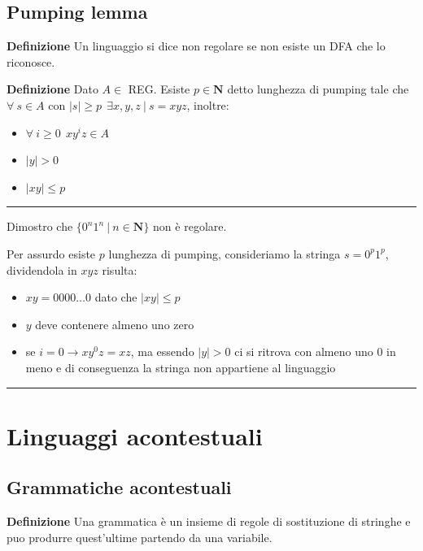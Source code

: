 \documentclass{article}
\begin{document}
\subsection{Pumping lemma}

\textbf{Definizione} Un linguaggio si dice non regolare se non esiste un DFA che lo riconosce.\newline

\noindent\textbf{Definizione} Dato $A\in$ REG. Esiste $p\in\mathbf{N}$ detto lunghezza di pumping tale che $\forall\ s \in A \text{ con } |s|\geq p\ \ \exists x,y,z\ |\ s=xyz$, inoltre:
\begin{itemize}
    \item $\forall\ i\geq0\ \ xy^iz\in A$
    \item $|y|>0$
    \item $|xy|\leq p$
\end{itemize}

\noindent\rule{\textwidth}{0.5pt}\newline

\noindent Dimostro che $\{0^n1^n\ |\ n\in \mathbf{N}\}$ non è regolare.\newline

\noindent Per assurdo esiste $p$ lunghezza di pumping, consideriamo la stringa $s=0^p1^p$, dividendola in $xyz$ risulta:
\begin{itemize}
    \item $xy=0000\ldots0$ dato che $|xy|\leq p$
    \item $y$ deve contenere almeno uno zero
    \item se $i=0\rightarrow xy^0z=xz$, ma essendo $|y|>0$ ci si ritrova con almeno uno 0 in meno e di conseguenza la stringa non appartiene al linguaggio
\end{itemize}

\noindent\rule{\textwidth}{0.5pt}\newline

\section{Linguaggi acontestuali}

\subsection{Grammatiche acontestuali}

\textbf{Definizione} Una grammatica è un insieme di regole di sostituzione di stringhe e puo produrre quest'ultime partendo da una variabile.\newline
\end{document}
